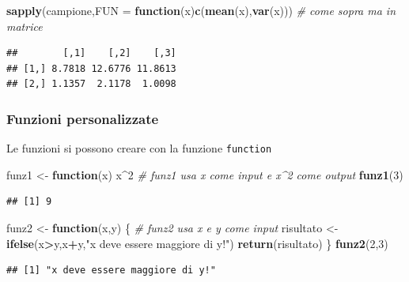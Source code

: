 \documentclass[
  11pt,
]{book}
\newenvironment{Shaded}{\begin{snugshade}}{\end{snugshade}}
\newcommand{\AttributeTok}[1]{\textcolor[rgb]{0.13,0.29,0.53}{#1}}
\newcommand{\CommentTok}[1]{\textcolor[rgb]{0.56,0.35,0.01}{\textit{#1}}}
\newcommand{\ControlFlowTok}[1]{\textcolor[rgb]{0.13,0.29,0.53}{\textbf{#1}}}
\newcommand{\DecValTok}[1]{\textcolor[rgb]{0.00,0.00,0.81}{#1}}
\newcommand{\FunctionTok}[1]{\textcolor[rgb]{0.13,0.29,0.53}{\textbf{#1}}}
\newcommand{\NormalTok}[1]{#1}
\newcommand{\OtherTok}[1]{\textcolor[rgb]{0.56,0.35,0.01}{#1}}
\newcommand{\SpecialCharTok}[1]{\textcolor[rgb]{0.81,0.36,0.00}{\textbf{#1}}}
\newcommand{\StringTok}[1]{\textcolor[rgb]{0.31,0.60,0.02}{#1}}
\theoremstyle{mytheoremstyle}
\theoremstyle{mydefstyle}
\begin{document}
\begin{Shaded}
\begin{Highlighting}[]
\FunctionTok{sapply}\NormalTok{(campione,}\AttributeTok{FUN =} \ControlFlowTok{function}\NormalTok{(x)}\FunctionTok{c}\NormalTok{(}\FunctionTok{mean}\NormalTok{(x),}\FunctionTok{var}\NormalTok{(x))) }\CommentTok{\# come sopra ma in matrice}
\end{Highlighting}
\end{Shaded}

\begin{verbatim}
##        [,1]    [,2]    [,3]
## [1,] 8.7818 12.6776 11.8613
## [2,] 1.1357  2.1178  1.0098
\end{verbatim}

\subsubsection{Funzioni personalizzate}\label{funzioni-personalizzate}

Le funzioni si possono creare con la funzione \texttt{function}

\begin{Shaded}
\begin{Highlighting}[]
\NormalTok{funz1 }\OtherTok{\textless{}{-}} \ControlFlowTok{function}\NormalTok{(x) x}\SpecialCharTok{\^{}}\DecValTok{2} \CommentTok{\# funz1 usa x come input e x\^{}2 come output}
\FunctionTok{funz1}\NormalTok{(}\DecValTok{3}\NormalTok{)}
\end{Highlighting}
\end{Shaded}

\begin{verbatim}
## [1] 9
\end{verbatim}

\begin{Shaded}
\begin{Highlighting}[]
\NormalTok{funz2 }\OtherTok{\textless{}{-}} \ControlFlowTok{function}\NormalTok{(x,y) \{ }\CommentTok{\# funz2 usa x e y come input }
\NormalTok{  risultato }\OtherTok{\textless{}{-}} \FunctionTok{ifelse}\NormalTok{(x}\SpecialCharTok{\textgreater{}}\NormalTok{y,x}\SpecialCharTok{+}\NormalTok{y,}\StringTok{"x deve essere maggiore di y!"}\NormalTok{)}
  \FunctionTok{return}\NormalTok{(risultato)}
\NormalTok{\} }
\FunctionTok{funz2}\NormalTok{(}\DecValTok{2}\NormalTok{,}\DecValTok{3}\NormalTok{)}
\end{Highlighting}
\end{Shaded}

\begin{verbatim}
## [1] "x deve essere maggiore di y!"
\end{verbatim}
\end{document}

